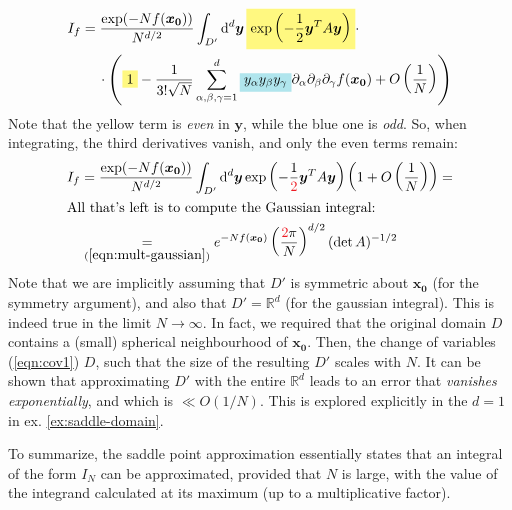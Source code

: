 \documentclass[../../main.tex]{subfiles}
\begin{document}
\begin{align}\label{eqn:before1}
    I_f &= \frac{\exp(-N f(\bm{x_0}))}{N^{d/2}} \int_{D'} \dd[d]{\bm{y}} \hlc{Yellow}{\exp\left(-\frac{1}{2} \bm{y}^T A \bm{y}\right) }\cdot\\ \nonumber
    &\quad \> \cdot \left(\hlc{Yellow}{1}-\frac{1}{3! \sqrt{N}} \sum_{\alpha, \beta, \gamma=1}^d \hlc{SkyBlue}{y_\alpha y_\beta y_\gamma} \partial_\alpha \partial_\beta \partial_\gamma f(\bm{x_0}) + O\left(\frac{1}{N} \right)\right)
\end{align}
Note that the yellow term is \textit{even} in $\bm{y}$, while the blue one is \textit{odd}. So, when integrating, the third derivatives vanish, and only the even terms remain:
\begin{align} \nonumber
    I_f &= \frac{\exp(-N f(\bm{x_0}))}{N^{d/2}} \int_{D'} \dd[d]{\bm{y}} {\exp\left(-\frac{1}{\textcolor{Red}{2}} \bm{y}^T A \bm{y}\right) } \left(1+ O\left(\frac{1}{N} \right)\right) =\\
    \shortintertext{All that's left is to compute the Gaussian integral:}
    &\underset{(\ref{eqn:mult-gaussian})}{=}  e^{-N f(\bm{x_0})} \left(\frac{\textcolor{Red}{2} \pi}{N} \right)^{d/2} (\operatorname{det}A)^{-1/2} \label{eqn:result-saddle}
\end{align}
Note that we are implicitly assuming that $D'$ is symmetric about $\bm{x_0}$ (for the symmetry argument), and also that $D' = \mathbb{R}^d$ (for the gaussian integral). This is indeed true in the limit $N \to \infty$. In fact, we required that the original domain $D$ contains a (small) spherical neighbourhood of $\bm{x_0}$. Then, the change of variables (\ref{eqn:cov1})  $D$, such that the size of the resulting $D'$ scales with $N$. It can be shown that approximating $D'$ with the entire $\mathbb{R}^d$ leads to an error that \textit{vanishes exponentially}, and which is $\ll O(1/N)$. This is explored explicitly in the $d=1$ in ex. \ref{ex:saddle-domain}.

\medskip

To summarize, the saddle point approximation essentially states that an integral of the form $I_N$ can be approximated, provided that $N$ is large, with the value of the integrand calculated at its maximum (up to a multiplicative factor). 
\end{document}
